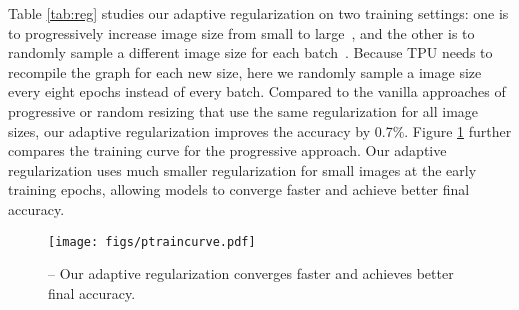 \documentclass{article}
\begin{document}
Table \ref{tab:reg} studies our adaptive regularization on two training settings: one is to progressively increase image size from small to large~\cite{fastaidawnbench}, and the other is to randomly sample a different image size for each batch~\cite{mixmatch19}. Because TPU needs to recompile the graph for each new size, here we randomly sample a image size every eight epochs instead of every batch. Compared to the vanilla approaches of progressive or random resizing that use the same regularization for all image sizes, our adaptive regularization improves the accuracy by 0.7\%. Figure \ref{fig:ptraincurve} further compares the training curve for the progressive approach. Our adaptive regularization uses much smaller regularization for small images at the early training epochs, allowing models to converge faster and achieve better final accuracy.

\begin{table}[!h]
    \vskip -0.1in
    \caption{
         Adaptive regularization -- We compare ImageNet top-1 accuracy based on the average of three runs.
       }
    \centering
    \label{tab:reg}
    \vskip -0.1in
\end{table} 
\begin{figure}[h]
    \vskip -0.1in
    \centering
    \texttt{[image: figs/ptraincurve.pdf]}
    \vskip -0.2in
    \caption{
         -- Our adaptive regularization converges faster and achieves better final accuracy.
    }
    \label{fig:ptraincurve}
    \vskip -0.1in
\end{figure}
 
\end{document}
